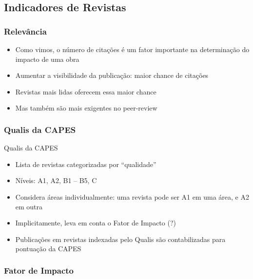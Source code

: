 \documentclass{beamer}
\begin{document}

\subsection{Indicadores de Revistas}

\subsubsection{Relevância}

\begin{frame}
  \begin{itemize}
  \item Como vimos, o número de citações é um fator importante na determinação do impacto de uma obra
  \item Aumentar a visibilidade da publicação: maior chance de citações
  \item Revistas mais lidas oferecem essa maior chance
  \item Mas também são mais exigentes no peer-review
  \end{itemize}
\end{frame}

\subsubsection{Qualis da CAPES}

\begin{frame}{Qualis da CAPES}
  \begin{itemize}
  \item Lista de revistas categorizadas por ``qualidade''
  \item Níveis: A1, A2, B1 -- B5, C
  \item Considera áreas individualmente: uma revista pode ser A1 em uma área, e A2 em outra
  \item Implicitamente, leva em conta o Fator de Impacto (?)
  \item Publicações em revistas indexadas pelo Qualis são contabilizadas para pontuação da CAPES
  \end{itemize}
\end{frame}

\subsubsection{Fator de Impacto}
\end{document}
